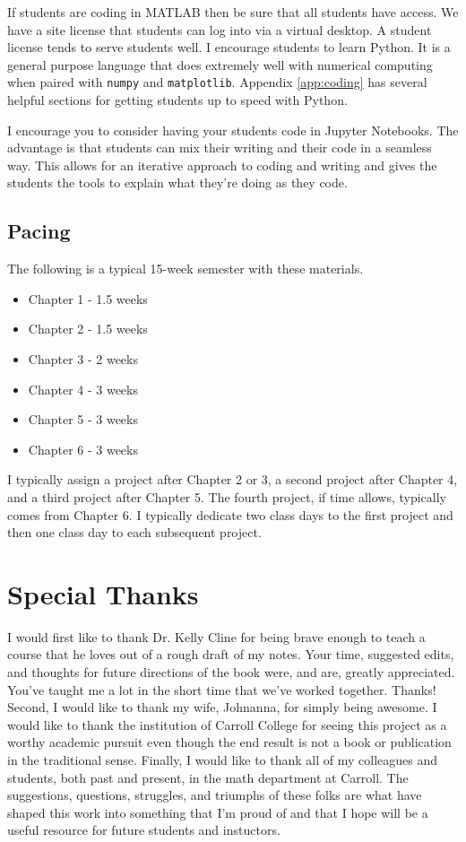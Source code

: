 \ifnum{} If students are coding in MATLAB then be sure that all students have
access.  We have a site license that students can log into via a virtual desktop.  A
student license tends to serve students well. \fi
\ifnum{} I encourage students to learn Python.  It is a general purpose language
that does extremely well with numerical computing when paired with \texttt{numpy} and
\texttt{matplotlib}.  Appendix \ref{app:coding} has several helpful sections for getting
students up to speed with Python.

I encourage you to consider having your students code in Jupyter Notebooks.  The advantage
is that students can mix their writing and their code in a seamless way.  This allows for
an iterative approach to coding and writing and gives the students the tools to explain
what they're doing as they code.
\fi

\subsection{Pacing}
The following is a typical 15-week semester with these materials.
\begin{itemize}
    \item Chapter 1 - 1.5 weeks
    \item Chapter 2 - 1.5 weeks
    \item Chapter 3 - 2 weeks
    \item Chapter 4 - 3 weeks
    \item Chapter 5 - 3 weeks
    \item Chapter 6 - 3 weeks
\end{itemize}
I typically assign a project after Chapter 2 or 3, a second project after Chapter 4, and a
third project after Chapter 5.  The fourth project, if time allows, typically comes from
Chapter 6.  I typically dedicate two class days to the first project and then one class
day to each subsequent project.

\section{Special Thanks}
I would first like to thank Dr. Kelly Cline for being brave enough to teach a course that
he loves out of a rough draft of my notes.  Your time, suggested edits, and thoughts for
future directions of the book were, and are, greatly appreciated.  You've taught me a lot
in the short time that we've worked together.  Thanks!  Second, I would like to
thank my wife, Johnanna, for simply being awesome.  I would like to thank the institution
of Carroll College for seeing this project as a worthy academic pursuit even though the
end result is not a book or publication in the traditional sense.  Finally, I would like
to thank all of my colleagues and students, both past and present, in the math department
at Carroll.  The suggestions, questions, struggles, and triumphs of these folks are what
have shaped this work into something that I'm proud of and that I hope will be a useful
resource for future students and instuctors.
